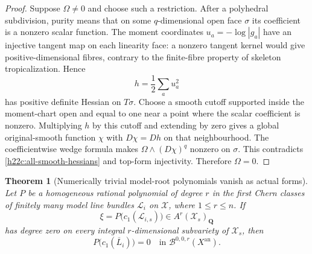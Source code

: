 \documentclass[11pt,a4paper]{article}
\newtheorem{theorem}{Theorem}[section]
\theoremstyle{definition}
\theoremstyle{remark}
\begin{document}
\begin{proof}
Suppose $\Omega\ne0$ and choose such a restriction.  After a
polyhedral subdivision, purity means that on some $q$-dimensional
open face $\sigma$ its coefficient is a nonzero scalar function.
The moment coordinates $u_a=-\log|g_a|$ have an injective tangent
map on each linearity face: a nonzero tangent kernel would give
positive-dimensional fibres, contrary to the finite-fibre property
of skeleton tropicalization.  Hence
\[
                         h=\frac12\sum_a u_a^2
\]
has positive definite Hessian on $T\sigma$.  Choose a smooth cutoff
supported inside the moment-chart open and equal to one near a point
where the scalar coefficient is nonzero.  Multiplying $h$ by this
cutoff and extending by zero gives a global original-smooth function
$\chi$ with $D\chi=Dh$ on that neighbourhood.  The coefficientwise
wedge formula makes
$\Omega\wedge(D\chi)^q$ nonzero on $\sigma$.
This contradicts \eqref{h22c:all-smooth-hessians} and top-form
injectivity.  Therefore $\Omega=0$.
\end{proof}

\begin{theorem}[Numerically trivial model-root polynomials vanish as actual forms]
\label{h22c:numerical-zero}
Let $P$ be a homogeneous rational polynomial of degree $r$ in the first
Chern classes of finitely many model line bundles $\mathcal L_i$ on
$\mathcal X$, where $1\le r\le n$.  If
\[
 \xi=P\bigl(c_1(\mathcal L_{i,s})\bigr)\in A^r(\mathcal X_s)_{\mathbf Q}
\]
has degree zero on every integral $r$-dimensional subvariety of
$\mathcal X_s$, then
\[
                    P\bigl(c_1(\overline L_i)\bigr)=0
                    \quad\text{in }\mathcal B^{0,0,r}(X^{\mathrm{an}}).
\]
\end{theorem}
\end{document}
